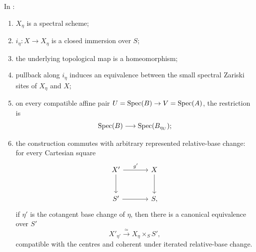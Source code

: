 \begin{proposition}
\label{prop:global-square-zero-geometric-properties}
In :
\begin{enumerate}[label=(\roman*)]
    \item \(X_\eta\) is a spectral scheme;
    \item \(i_\eta:X\to X_\eta\) is a closed immersion over \(S\);
    \item the underlying topological map is a homeomorphism;
    \item pullback along \(i_\eta\) induces an equivalence between the small
    spectral Zariski sites of \(X_\eta\) and \(X\);
    \item on every compatible affine pair
    \(U=\operatorname{Spec}(B)\to V=\operatorname{Spec}(A)\), the restriction is
    \[
        \operatorname{Spec}(B)\longrightarrow\operatorname{Spec}(B_{\eta_U});
    \]
    \item the construction commutes with arbitrary represented relative-base
    change: for every Cartesian square
    \[
    \begin{tikzcd}[column sep=large,row sep=large]
        X' \arrow[r,"g'"] \arrow[d]
            & X \arrow[d]
        \\
        S' \arrow[r]
            & S,
    \end{tikzcd}
    \]
    if \(\eta'\) is the cotangent base change of \(\eta\), then there is a
    canonical equivalence over \(S'\)
    \[
        X'_{\eta'}\xrightarrow{\simeq}X_\eta\times_SS',
    \]
    compatible with the centres and coherent under iterated relative-base
    change.
\end{enumerate}
\end{proposition}

